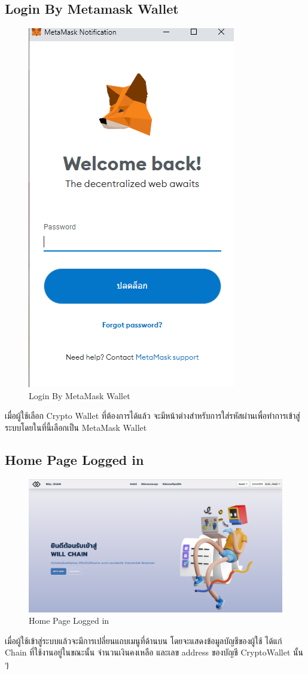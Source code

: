 \documentclass[12pt,oneside,openright,a4paper]{cpe-thai-project}
\begin{document}
\clearpage

\subsection{Login By Metamask Wallet}
	\begin{figure}[!thb]
			\centering
			\includegraphics[scale=0.5]{metamaskLogin4}
			\caption{Login By MetaMask Wallet}
		\end{figure}
		\FloatBarrier
\tab เมื่อผู้ใช้เลือก Crypto Wallet ที่ต้องการได้แล้ว จะมีหน้าต่างสำหรับการใส่รหัสผ่านเพื่อทำการเข้าสู่ระบบโดยในที่นี้เลือกเป็น MetaMask Wallet 
\subsection{Home Page Logged in}
	\begin{figure}[!thb]
			\centering
			\includegraphics[scale=0.2]{homePageAfter4}
			\caption{Home Page Logged in }
		\end{figure}
		\FloatBarrier
\tab เมื่อผู้ใช้เข้าสู่ระบบแล้วจะมีการเปลี่ยนแถบเมนูที่ด้านบน โดยจะแสดงข้อมูลบัญชีของผู้ใช้ ได้แก่ Chain ที่ใช้งานอยู่ในขณะนั้น จำนวนเงินคงเหลือ และเลข address ของบัญชี CryptoWallet นั้น ๆ 
\end{document}
